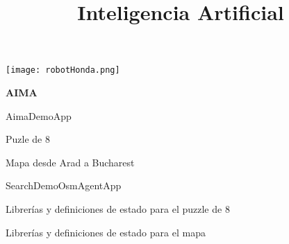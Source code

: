 \documentclass[spanish, a4paper, 12pt]{article} 	%
\begin{document}
\title{\textbf{Inteligencia Artificial}}
\maketitle

\begin{center}
{\texttt{[image: robotHonda.png]}}
\end{center}

\newpage
\textbf{{AIMA}}


\begin{section}{AimaDemoApp }


\end{section}

\newpage
\begin{section}{Puzle de 8}

	
\end{section}

\begin{section}{Mapa desde Arad a Bucharest}


\end{section}


\begin{section}{SearchDemoOsmAgentApp }


\end{section}


\begin{section}{Librerías y definiciones de estado para el puzzle de 8 }


\end{section}


\begin{section}{Librerías y definiciones de estado para el mapa }


\end{section}
\end{document}
